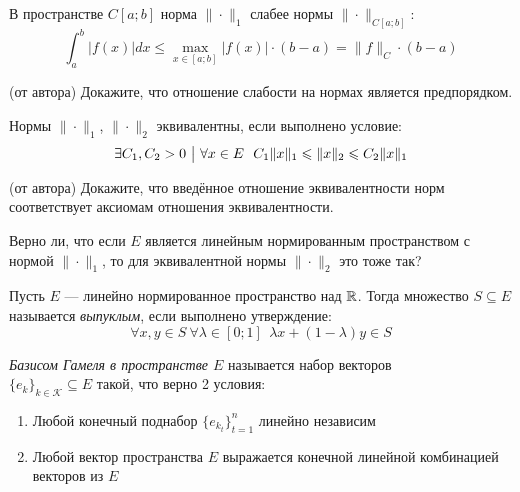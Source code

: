 \begin{example}
	В пространстве $C[a; b]$ норма $\|\cdot\|_1$ слабее нормы $\|\cdot\|_{C[a; b]}$:
	\[
		\int_a^b |f(x)|dx \le \max_{x \in [a; b]} |f(x)| \cdot (b - a) = \|f\|_C \cdot (b - a)
	\]
\end{example}

\begin{exercise} (от автора)
	Докажите, что отношение слабости на нормах является предпорядком.
\end{exercise}

\begin{definition}
	Нормы $\|\cdot\|_1$, $\|\cdot\|_2$ эквивалентны, если выполнено условие:
	\[
		\exists C_1, C_2 > 0 \such \forall x \in E\ \ C_1\|x\|_1 \le \|x\|_2 \le C_2\|x\|_1
	\]
\end{definition}

\begin{exercise} (от автора)
	Докажите, что введённое отношение эквивалентности норм соответствует аксиомам отношения эквивалентности.
\end{exercise}

\begin{exercise}
	Верно ли, что если $E$ является линейным нормированным пространством с нормой $\|\cdot\|_1$, то для эквивалентной нормы $\|\cdot\|_2$ это тоже так?
\end{exercise}

\begin{definition}
	Пусть $E$ --- линейно нормированное пространство над $\mathbb{R}$. Тогда множество $S \subseteq E$ называется \textit{выпуклым}, если выполнено утверждение:
	\[
		\forall x, y \in S\ \forall \lambda \in [0; 1]\ \ \lambda x + (1 - \lambda)y \in S
	\]
\end{definition}

\begin{definition}
	\textit{Базисом Гамеля в пространстве $E$} называется набор векторов \\ $\{e_k\}_{k \in \mathcal{K}} \subseteq E$ такой, что верно 2 условия:
	\begin{enumerate}
		\item Любой конечный поднабор $\{e_{k_t}\}_{t = 1}^n$ линейно независим
		
		\item Любой вектор пространства $E$ выражается конечной линейной комбинацией векторов из $E$
	\end{enumerate}
\end{definition}

